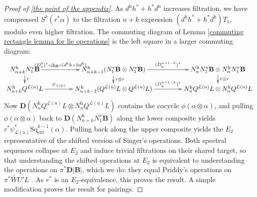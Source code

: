 \documentclass[11pt]{amsart} \renewcommand{\baselinestretch}{1.2}
\theoremstyle{plain}
\theoremstyle{definition}
\let\oldphi\phi
\let\phi\varphi
\newcommand{\calL}{\mathcal{L}}
\newcommand{\DeltatubfD}{\Delta_{\mathrm{\textbf{B}}}}
\newcommand{\ExtCohOp}{\mathrm{Sq}_\mathrm{ext}}
\newcommand{\UEA}{U'}%
\newcommand{\uver}{^\mathrm{v}}
\newcommand{\uhor}{^\mathrm{h}}
\newcommand{\dver}{_\mathrm{v}}
\newcommand{\dhor}{_\mathrm{h}}
\newcommand{\deltav}{\delta\uver}
\newcommand{\diag}[1]{|#1|}
\newcommand{\dual}{\mathbf{D}}
\begin{document}
\begin{appendices}
\begin{proof}[Proof of \ref{the point of the appendix}]
As $d\uhor h^*+ h^*d\uhor$ increases filtration, we have compressed $S^k(r^*\alpha)$ to the filtration $n+k$ expression $(d\uhor h^*+ h^*d\uhor)T_1$, modulo even higher filtration.
The commuting diagram of Lemma \ref{commuting rectangle lemma for lie operations} is the left square in a larger commuting diagram:
\[\xymatrix@R=4mm@C=15mm{
N\uhor_{n+k}N\uver_1\textbf{B} \ar[d]^-{r}
 \ar[r]^-{(D\dver^0)^\star\circ\DeltatubfD\circ (d\uhor h+hd\uhor)}&%
N\uhor_{n+k-1}(N\uver_1\textbf{B}\otimes N\uver_1\textbf{B})\ar[d]^-{r\otimes r}\ar[r]^-{ (D\dhor^{n+1-k})^\star}
&
N\uhor_nN\uver_1\textbf{B}\otimes N\uhor_nN\uver_1\textbf{B}\ar[d]^-{r\otimes r}
\\%
N\uhor_{n+k}Q^{\calL(n)} L  \ar[r]^-{\psi_{\calL(n)}}&%
N\uhor_{n+k-1}(Q^{\calL(n)} L \otimes Q^{\calL(n)} L )
\ar[r]^-{ (D\dhor^{n+1-k})^\star}
&
N\uhor_nQ^{\calL(n)} L \otimes N\uhor_nQ^{\calL(n)} L 
}\]
Now $\dual(N\uhor_nQ^{\calL(n)} L \otimes N\uhor_nQ^{\calL(n)} L )$ contains the cocycle $\oldphi(\alpha\otimes\alpha)$, and pulling $\oldphi(\alpha\otimes\alpha)$ back to $\dual(N\uhor_{n+k}N\uver_1\textbf{B})$ along the lower composite yields $r^*\psi_{\calL(n)}^*\ExtCohOp^{k-1}(\alpha)$. Pulling back along the upper composite yields the $E_2$ representative of the shifted version of Singer's operations. 
Both spectral sequences collapse at $E_2$ and induce trivial filtrations on their shared target, so that understanding the shifted operations at $E_2$ is equivalent to understanding the operations on $\pi^*\dual\diag{\textbf{B}}$, which we do: they equal Priddy's operations on $\pi^*\bar{W}\UEA L$ \cite[\S5]{PriddySimplicialLie.pdf}.
As $r^*$ is an $E_2$-equivalence, this proves the result. A simple modification proves the result for pairings.
\end{proof}

\end{appendices}
\end{document}
